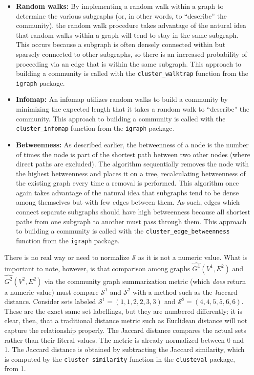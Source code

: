 \tablespacing
\begin{itemize}
	\item \textbf{Random walks:} By implementing a random walk within a graph 
	to determine the various subgraphs (or, in other words, to ``describe'' the 
	community), the random walk procedure takes advantage of the natural idea 
	that random walks within a graph will tend to stay in the same subgraph. 
	This occurs because a subgraph is often densely connected within but 
	sparsely connected to other subgraphs, so there is an increased probability 
	of proceeding via an edge that is within the same subgraph.
	This approach to building a community is called with the 
	\texttt{cluster\_walktrap} function from the \texttt{igraph} package.	
	
	\item \textbf{Infomap:} An infomap utilizes random walks to build a 
	community by minimizing the expected length that it takes a random walk 
	to ``describe'' the community.
	This approach to building a community is called with the 
	\texttt{cluster\_infomap} function from the \texttt{igraph} package.
	
	\item \textbf{Betweenness:} As described earlier, the betweenness of a node 
	is the number of times the node is part of the shortest path between two 
	other nodes (where direct paths are excluded). The algorithm sequentially 
	removes the node with the highest betweenness and places it on a tree, 
	recalculating betweenness of the existing graph every time a removal is 
	performed. This algorithm once again takes advantage of the natural idea 
	that subgraphs tend to be dense among themselves but with few edges between 
	them. As such, edges which connect separate subgraphs should have high 
	betweenness because all shortest paths from one subgraph to another must 
	pass through them. 
	This approach to building a community is called with the 
	\texttt{cluster\_edge\_betweenness} function from the \texttt{igraph} 
	package.
\end{itemize}
\bodyspacing

There is no real way or need to normalize $\mathcal{S}$ as it is not a numeric 
value. What is important to note, however, is that comparison among 
graphs $\hat{G^1}(V^1,E^2)$ and $\hat{G^2}(V^2,E^2)$ via the community graph 
summarization metric (which \textit{does} return a numeric value)
must compare $\mathcal{S}^1$ and $\mathcal{S}^2$ with a method such as the 
Jaccard distance. Consider sets labeled $\mathcal{S}^1=(1,1,2,2,3,3)$ and 
$\mathcal{S}^2=(4,4,5,5,6,6)$. These are the exact same set labellings, but 
they are numbered differently; it is clear, then, that a traditional distance 
metric such as Euclidean distance will not capture the relationship properly. 
The Jaccard distance compares the actual sets rather than their literal values. 
The metric is already normalized between 0 and 1.
The Jaccard distance is obtained by subtracting the Jaccard similarity, which 
is computed by the \texttt{cluster\_similarity} function in the 
\texttt{clusteval} package, from 1.

